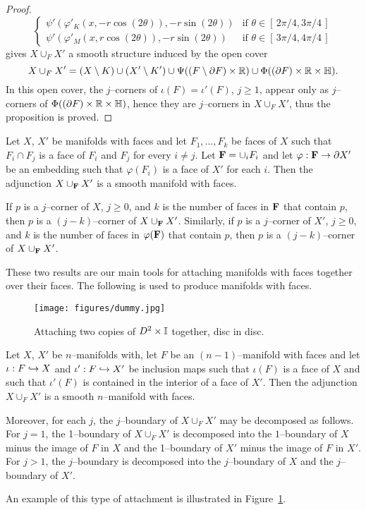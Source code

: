\begin{proof}
\[\begin{cases}
			\psi'(\varphi'_K(x,-r\cos(2\theta)),-r\sin(2\theta))				
				&	\mbox{if } \theta\in[\,2\pi/4,3\pi/4\,]	\\
			\psi'(\varphi'_M(x,r\cos(2\theta)),-r\sin(2\theta))				
				&	\mbox{if } \theta\in[\,3\pi/4,4\pi/4\,]
		\end{cases}	
	\]
	gives $X\cup_F X'$ a smooth structure induced by the open cover
	\[
		X\cup_F X'=(X\setminus K)\cup(X'\setminus K')\cup\Psi((F\setminus\partial F)\times\mathbb{R})\cup	\Phi((\partial F)\times\mathbb{R}\times\mathbb{H}).
	\]
	In this open cover, the $j$--corners of $\iota(F)=\iota'(F)$, $j\geq 1$, appear only as $j$--corners of $\Phi((\partial F)\times\mathbb{R}\times\mathbb{H})$, hence they are $j$--corners in $X\cup_F X'$, thus the proposition is proved.
\end{proof}

\begin{cor}
	\label{cor:addfaces}
	Let $X$, $X'$ be manifolds with faces and let $F_1,\dots, F_k$ be faces of $X$ such that $F_i\cap F_j$ is a face of $F_i$ and $F_j$ for every $i\neq j$.
	Let ${\bf F}=\cup_i F_i$ and let $\varphi:{\bf F}\to \partial X'$ be an embedding such that $\varphi(F_i)$ is a face of $X'$ for each $i$.
	Then the adjunction $X \cup_{\bf F} X'$ is a smooth manifold with faces.
		
	If $p$ is a $j$--corner of $X$, $j\geq 0$, and $k$ is the number of faces in ${\bf F}$ that contain $p$, then $p$ is a $(j-k)$--corner of $X\cup_{\bf F} X'$.
	Similarly, if $p$ is a $j$--corner of $X'$, $j\geq 0$, and $k$ is the number of faces in $\varphi({\bf F})$ that contain $p$, then $p$ is a $(j-k)$--corner of $X\cup_{\bf F} X'$.
\end{cor}

These two results are our main tools for attaching manifolds with faces together over their faces.
The following is used to produce manifolds with faces.

\begin{figure}[H]
	\centering
	\caption{Attaching two copies of $D^2\times\mathbb{I}$ together, disc in disc.}
	\texttt{[image: figures/dummy.jpg]}
	\label{fig:cyloncyl}
\end{figure}

\begin{prop}
	\label{prop:attachingManifoldsFaceUInterior}
	Let $X$, $X'$ be $n$--manifolds with, let $F$ be an $(n-1)$--manifold with faces and let $\iota:F\hookrightarrow X$ and $\iota':F\hookrightarrow X'$ be inclusion maps such that $\iota(F)$ is a face of $X$ and such that $\iota'(F)$ is contained in the interior of a face of $X'$.
	Then the adjunction $X\cup_F X'$ is a smooth $n$--manifold with faces.
	
	Moreover, for each $j$, the $j$--boundary of $X\cup_F X'$ may be decomposed as follows.
	For $j=1$, the 1--boundary of $X\cup_F X'$ is decomposed into the $1$--boundary of $X$ minus the image of $F$ in $X$ and the 1--boundary of $X'$ minus the image of $F$ in $X'$.
	For $j>1$, the $j$--boundary is  decomposed into the $j$--boundary of $X$ and the $j$--boundary of $X'$.
	
	An example of this type of attachment is illustrated in Figure~\ref{fig:cyloncyl}.
\end{prop}

